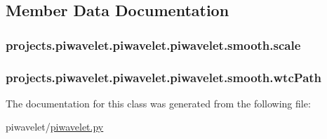 \subsection{Member Data Documentation}
\hypertarget{classprojects_1_1piwavelet_1_1piwavelet_1_1piwavelet_1_1smooth_a367a5c417ed5d4e2da1026b43f47cd07}{
\subsubsection[{scale}]{\setlength{\rightskip}{0pt plus 5cm}projects.\-piwavelet.\-piwavelet.\-piwavelet.\-smooth.\-scale}}\label{classprojects_1_1piwavelet_1_1piwavelet_1_1piwavelet_1_1smooth_a367a5c417ed5d4e2da1026b43f47cd07}
\hypertarget{classprojects_1_1piwavelet_1_1piwavelet_1_1piwavelet_1_1smooth_a6c6d2bf5f8515fa43e012a567b44aab3}{
\subsubsection[{wtc\-Path}]{\setlength{\rightskip}{0pt plus 5cm}projects.\-piwavelet.\-piwavelet.\-piwavelet.\-smooth.\-wtc\-Path}}\label{classprojects_1_1piwavelet_1_1piwavelet_1_1piwavelet_1_1smooth_a6c6d2bf5f8515fa43e012a567b44aab3}


The documentation for this class was generated from the following file\-:\begin{DoxyCompactItemize}
\item 
piwavelet/\hyperlink{piwavelet_8py}{piwavelet.\-py}\end{DoxyCompactItemize}
